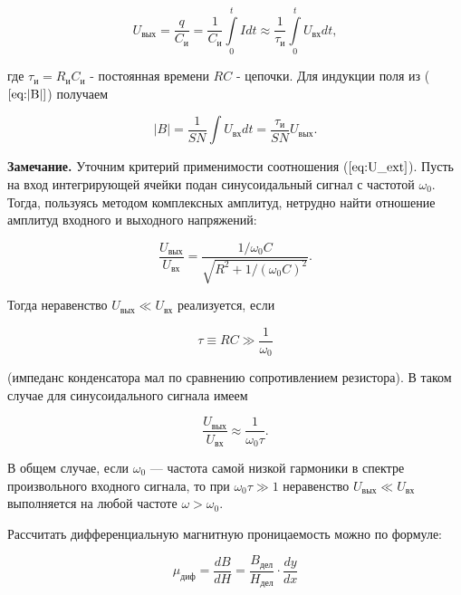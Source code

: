 \documentclass[12pt,a4paper]{article}
\begin{document}
\begin{equation}
U_{\text{вых}} = \frac{q}{C_\text{и}} = \frac{1}{C_\text{и}}\int\limits_0^t Idt \approx \frac{1}{\tau_\text{и}} \int\limits_0^t U_{\text{вх}}dt,
\label{eq:U_ext}
\end{equation}

где $\tau_\text{и}=R_\text{и}C_\text{и}$ - постоянная времени $ RC $ - цепочки. Для индукции поля из ($\ref{eq:|B|}$) получаем 

\begin{equation}
|B|=\frac{1}{SN}\int U_{\text{вх}} dt=\frac{\tau_\text{и}}{SN}U_{\text{вых}}.
\label{eq:|B|new}
\end{equation}

\textbf{Замечание.} Уточним критерий применимости соотношения ($\ref{eq:U_ext}$). Пусть на вход интегрирующей ячейки подан синусоидальный сигнал с частотой $\omega_0$. Тогда, пользуясь методом комплексных амплитуд, нетрудно найти отношение амплитуд входного и выходного напряжений:

\begin{equation}
\frac{U_{\text{вых}}}{U_{\text{вх}}}=\frac{1/\omega_0C}{\sqrt{R^2+1/(\omega_0C)^2}}.
\end{equation}

Тогда неравенство $U_{\text{вых}} \ll U_{\text{вх}}$ реализуется, если 

\begin{equation}
\tau \equiv RC\gg \frac{1}{\omega_0}
\end{equation}

(импеданс конденсатора мал по сравнению сопротивлением резистора).
В таком случае для синусоидального сигнала имеем

\begin{equation}
\frac{U_{\text{вых}}}{U_{\text{вх}}}\approx\frac{1}{\omega_0\tau}.
\label{eq:tau}
\end{equation}

В общем случае, если $\omega_0$ — частота самой низкой гармоники в спектре
произвольного входного сигнала, то при $\omega_0\tau \gg 1$ неравенство $U_{\text{вых}} \ll U_{\text{вх}}$ выполняется на любой частоте $\omega > \omega_0$.

Рассчитать дифференциальную магнитную проницаемость можно по формуле:

\begin{equation}
    \mu_\text{диф}=\frac{dB}{dH}=\frac{B_\text{дел}}{H_\text{дел}}\cdot \frac{dy}{dx}
\end{equation}
\end{document}
